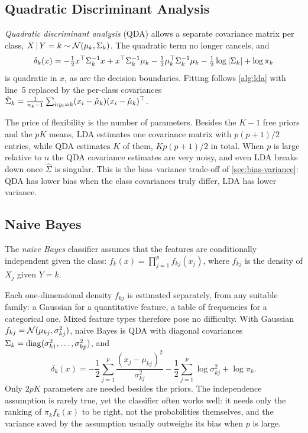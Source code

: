 \subsection{Quadratic Discriminant Analysis}\label{sec:qda}

\emph{Quadratic discriminant analysis} (QDA) allows a separate covariance matrix per class, $X\,|\, Y=k\sim\mathcal{N}(\mu_k,\Sigma_k)$. The quadratic term no longer cancels, and
\[
\delta_k(x)=-\tfrac12x^{\top}\Sigma_k^{-1}x+x^{\top}\Sigma_k^{-1}\mu_k-\tfrac12\mu_k^{\top}\Sigma_k^{-1}\mu_k-\tfrac12\log|\Sigma_k|+\log\pi_k
\]
is quadratic in $x$, as are the decision boundaries. Fitting follows \cref{alg:lda} with line~5 replaced by the per-class covariances $\hat\Sigma_k=\frac1{n_k-1}\sum_{i:y_i=k}(x_i-\hat\mu_k)(x_i-\hat\mu_k)^{\top}$.

The price of flexibility is the number of parameters. Besides the $K-1$ free priors and the $pK$ means, LDA estimates one covariance matrix with $p(p+1)/2$ entries, while QDA estimates $K$ of them, $Kp(p+1)/2$ in total. When $p$ is large relative to $n$ the QDA covariance estimates are very noisy, and even LDA breaks down once $\hat\Sigma$ is singular. This is the bias--variance trade-off of \cref{sec:bias-variance}: QDA has lower bias when the class covariances truly differ, LDA has lower variance.

\subsection{Naive Bayes}\label{sec:naive-bayes}

\begin{definition}
The \emph{naive Bayes} classifier assumes that the features are conditionally independent given the class: $f_k(x)=\prod_{j=1}^pf_{kj}(x_j)$, where $f_{kj}$ is the density of $X_j$ given $Y=k$.
\end{definition}

Each one-dimensional density $f_{kj}$ is estimated separately, from any suitable family: a Gaussian for a quantitative feature, a table of frequencies for a categorical one. Mixed feature types therefore pose no difficulty. With Gaussian $f_{kj}=\mathcal{N}(\mu_{kj},\sigma_{kj}^2)$, naive Bayes is QDA with diagonal covariances $\Sigma_k=\operatorname{diag}(\sigma_{k1}^2,\dots,\sigma_{kp}^2)$, and
\[
\delta_k(x)=-\frac12\sum_{j=1}^p\frac{(x_j-\mu_{kj})^2}{\sigma_{kj}^2}-\frac12\sum_{j=1}^p\log\sigma_{kj}^2+\log\pi_k.
\]
Only $2pK$ parameters are needed besides the priors. The independence assumption is rarely true, yet the classifier often works well: it needs only the ranking of $\pi_kf_k(x)$ to be right, not the probabilities themselves, and the variance saved by the assumption usually outweighs its bias when $p$ is large.

